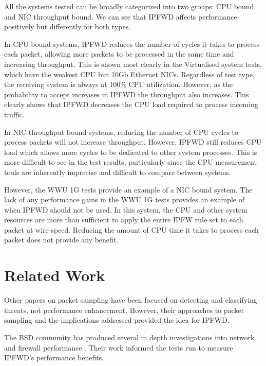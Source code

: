 \documentclass[journal]{IEEEtran}
\begin{document}
    All the systems tested can be broadly categorized into two groups: CPU
    bound and NIC throughput bound. We can see that IPFWD affects performance
    positively but differently for both types. 

    In CPU bound systems, IPFWD reduces the number of cycles it takes to
    process each packet, allowing more packets to be processed in the same time
    and increasing throughput. This is shown most clearly in the Virtualised
    system tests, which have the weakest CPU but 10Gb Ethernet NICs. Regardless
    of test type, the receiving system is always at 100\% CPU utilization.
    However, as the probability to accept increases in IPFWD the throughput
    also increases.  This clearly shows that IPFWD decreases the CPU load
    required to process incoming traffic.

    In NIC throughput bound systems, reducing the number of CPU cycles to
    process packets will not increase throughput. However, IPFWD still reduces
    CPU load which allows more cycles to be dedicated to other system
    processes. This is more difficult to see in the test results, particularly
    since the CPU measurement tools are inherently imprecise and difficult to
    compare between systems. 
    
    However, the WWU 1G tests provide an example of a NIC bound system. The
    lack of any performance gains in the WWU 1G tests provides an example of
    when IPFWD should not be used. In this system, the CPU and other system
    resources are more than sufficient to apply the entire IPFW rule set to
    each packet at wire-speed. Reducing the amount of CPU time it takes to
    process each packet does not provide any benefit.


\section{Related Work}

  Other papers \cite{exploitingpacketsampling, analysisnetflow,
  monitoringpacketsampling} on packet sampling have been focused on detecting
  and classifying threats, not performance enhancement. However, their
  approaches to packet sampling and the implications addressed provided the
  idea for IPFWD. 

  The BSD community has produced several in depth investigations into network
  and firewall performance \cite{ipfwvspf,optimizingfreebsd}. Their work
  informed the tests run to measure IPFWD's performance benefits.
\end{document}
